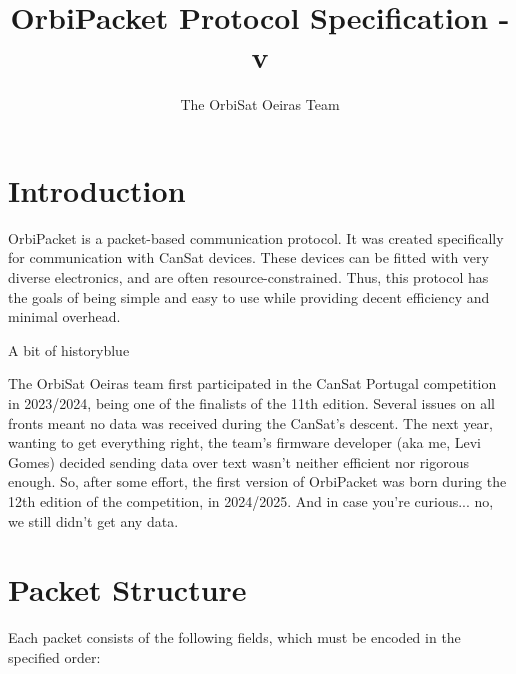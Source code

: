 \documentclass[a4paper,11pt,english]{article}
\title{OrbiPacket Protocol Specification - v\version}
\author{The OrbiSat Oeiras Team}
\date{}
\def\notebox#1#2{
  \begin{admobox}{#1}{blue}
  #2
  \end{admobox}
}
\begin{document}
\maketitle
\tableofcontents

\section{Introduction}

OrbiPacket is a packet-based communication protocol. It was created specifically for communication with CanSat devices. These devices can be fitted with very diverse electronics, and are often resource-constrained. Thus, this protocol has the goals of being simple and easy to use while providing decent efficiency and minimal overhead.

\notebox{A bit of history}{
  The OrbiSat Oeiras team first participated in the CanSat Portugal competition in 2023/2024, being one of the finalists of the 11th edition. Several issues on all fronts meant no data was received during the CanSat's descent. The next year, wanting to get everything right, the team's firmware developer (aka me, Levi Gomes) decided sending data over text wasn't neither efficient nor rigorous enough. So, after some effort, the first version of OrbiPacket was born during the 12th edition of the competition, in 2024/2025. And in case you're curious... no, we still didn't get any data.
}

\section{Packet Structure}

Each packet consists of the following fields, which must be encoded in the specified order:
\end{document}
